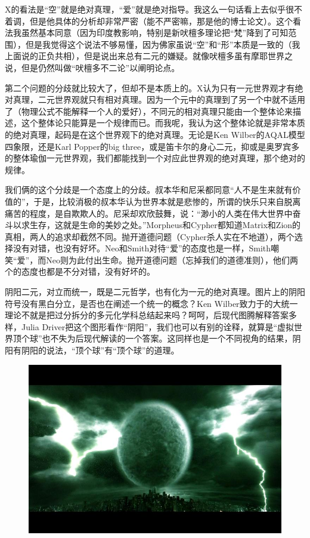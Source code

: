 \documentclass[UTF8]{ctexart}
\begin{document}
X的看法是“空”就是绝对真理，“爱”就是绝对指导。我这么一句话看上去似乎很不着调，但是他具体的分析却非常严密（能不严密嘛，那是他的博士论文）。这个看法我虽然基本同意（因为印度教影响，特别是新吠檀多理论把“梵”降到了可知范围），但是我觉得这个说法不够易懂，因为佛家虽说“空”和“形”本质是一致的（我上面说的正负共相），但是说出来总有二元的嫌疑。就像吠檀多虽有摩耶世界之说，但是仍然叫做“吠檀多不二论”以阐明论点。

第二个问题的分歧就比较大了，但却不是本质上的。X认为只有一元世界观才有绝对真理，二元世界观就只有相对真理。因为一个元中的真理到了另一个中就不适用了（物理公式不能解释一个人的爱好），不同元的相对真理只能由一个整体论来描述，这个整体论只能算是一个规律而已。而我呢，我认为这个整体论就是非常本质的绝对真理，起码是在这个世界观下的绝对真理。无论是Ken Wilber的AQAL模型四象限，还是Karl Popper的big three，或是笛卡尔的身心二元，抑或是奥罗宾多的整体瑜伽一元世界观，我们都能找到一个对应此世界观的绝对真理，那个绝对的规律。

我们俩的这个分歧是一个态度上的分歧。叔本华和尼采都同意“人不是生来就有价值的”，于是，比较消极的叔本华认为世界本就是悲惨的，所谓的快乐只来自脱离痛苦的程度，是自欺欺人的。尼采却欢欣鼓舞，说：“渺小的人类在伟大世界中奋斗以求生存，这就是生命的美妙之处。”Morpheus和Cypher都知道Matrix和Zion的真相，两人的追求却截然不同。抛开道德问题（Cypher杀人实在不地道），两个选择没有对错，也没有好坏。Neo和Smith对待“爱”的态度也是一样，Smith嘲笑“爱”，而Neo则为此付出生命。抛开道德问题（忘掉我们的道德准则），他们两个的态度也都是不分对错，没有好坏的。

阴阳二元，对立而统一，既是二元哲学，也有化为一元的绝对真理。图片上的阴阳符号没有黑白分立，是否也在阐述一个统一的概念？Ken Wilber致力于的大统一理论不就是把过分拆分的多元化学科总结起来吗？呵呵，后现代图腾解释答案多样，Julia Driver把这个图形看作“阴阳”，我们也可以有别的诠释，就算是“虚拟世界顶个球”也不失为后现代解读的一个答案。这同样也是一个不同视角的结果，阴阳有阴阳的说法，“顶个球”有“顶个球”的道理。

\begin{figure}[htb]
\centering
\includegraphics[width=0.5\linewidth]{fig/9f24f31ff48b0460f624e48c.jpg}
\end{figure}
\end{document}
